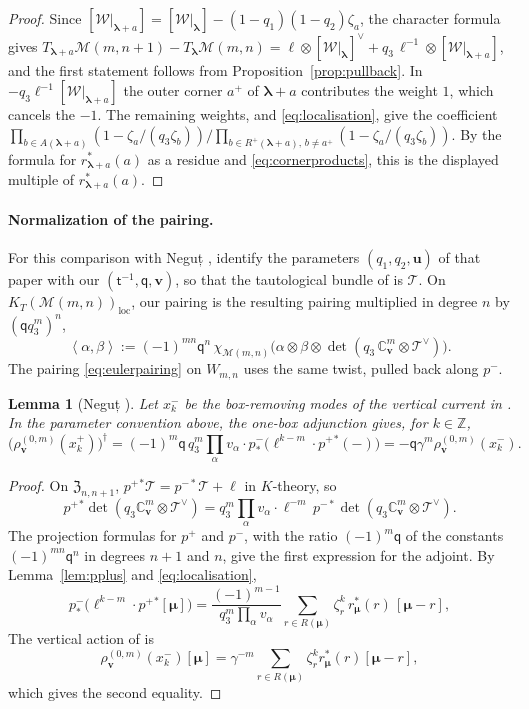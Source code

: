 \documentclass[11pt]{amsart}
\newtheorem{lemma}[theorem]{Lemma}
\theoremstyle{definition}
\theoremstyle{remark}
\newcommand{\Mq}{\mathsf q}                      %
\newcommand{\Mt}{\mathsf t}                      %
\newcommand{\bv}{{\mathbf v}}                    %
\newcommand{\bl}{{\boldsymbol{\lambda}}}         %
\newcommand{\bmu}{{\boldsymbol{\mu}}}
\newcommand{\Add}[1]{A(#1)}                      %
\newcommand{\Rem}[1]{R(#1)}                      %
\newcommand{\bwt}[1]{\zeta_{#1}}                 %
\newcommand{\cores}[2]{r^*_{#1}(#2)}             %
\newcommand{\ip}[2]{\left\langle #1,#2\right\rangle}
\newcommand{\bplus}[1]{{#1}^{+}}                 %
\newcommand{\Remp}[1]{R^{+}(#1)}                 %
\newcommand{\Wdeg}[2]{W_{#1,#2}}                 %
\newcommand{\Kloc}[1]{K_T(#1)_{\mathrm{loc}}}    %
\newcommand{\framing}{\mathbb C^m_{\bv}}         %
\newcommand{\Gies}[2]{\mathcal M(#1,#2)}         %
\newcommand{\Zc}{\mathfrak Z}
\newcommand{\Hecke}[1]{\Zc_{#1,#1+1}}            %
\newcommand{\Wc}{\mathcal W}                     %
\newcommand{\Tc}{\mathcal T}                     %
\newcommand{\fix}[1]{[#1]}                       %
\newcommand{\pminus}{p^-}                        %
\newcommand{\pplus}{p^+}                         %
\newcommand{\taut}{\ell}                         %
\newcommand{\pulm}{p^{-*}}                       %
\newcommand{\xplus}[1]{x^+_{#1}}                 %
\newcommand{\rhov}{\rho^{(0,m)}_{\bv}}           %
\newcommand{\Negut}{Neguț}
\begin{document}
\begin{proof}
Since \([\Wc|_{\bl+a}]=[\Wc|_\bl]-(1-q_1)(1-q_2)\bwt{a}\), the character formula
gives
\(T_{\bl+a}\Gies{m}{n+1}-T_\bl\Gies{m}{n}
=\taut\otimes[\Wc|_\bl]^\vee+q_3\,\taut^{-1}\otimes[\Wc|_{\bl+a}]\), and the
first statement follows from Proposition~\ref{prop:pullback}. In
\(-q_3\taut^{-1}[\Wc|_{\bl+a}]\) the outer corner \(\bplus{a}\) of \(\bl+a\)
contributes the weight \(1\), which cancels the \(-1\). The remaining weights,
and \eqref{eq:localisation}, give the coefficient
\(\prod_{b\in\Add{\bl+a}}(1-\bwt{a}/(q_3\bwt{b}))
/\prod_{b\in\Remp{\bl+a},\,b\neq\bplus{a}}(1-\bwt{a}/(q_3\bwt{b}))\). By the
formula for \(\cores{\bl+a}{a}\) as a residue and \eqref{eq:cornerproducts},
this is the displayed multiple of \(\cores{\bl+a}{a}\).
\end{proof}

\paragraph{Normalization of the pairing.}
For this comparison with \Negut{} \cite[(3.35)]{N3}, identify the parameters
\((q_1,q_2,\mathbf u)\) of that paper with our
\((\Mt^{-1},\Mq,\bv)\), so that the tautological bundle of \cite{N3} is \(\Tc\).
On \(\Kloc{\Gies{m}{n}}\), our pairing is the resulting pairing multiplied
in degree \(n\) by \((\Mq q_3^m)^n\),
\[
 \ip{\alpha}{\beta}:=(-1)^{mn}\Mq^{n}\,\chi_{\Gies{m}{n}}\bigl(\alpha\otimes\beta\otimes
 \det(q_3\,\framing\otimes\Tc^\vee)\bigr).
\]
The pairing \eqref{eq:eulerpairing} on \(\Wdeg{m}{n}\) uses the same twist,
pulled back along \(\pminus\).

\begin{lemma}[{\Negut{} \cite{N3}}]\label{lem:negut}
Let \(x^-_k\) be the box-removing modes of the vertical current in \cite{BCS}.
In the parameter convention above, the one-box adjunction
\cite[(3.39)]{N3} gives, for \(k\in\mathbb Z\),
\[
 \bigl(\rhov(\xplus{k})\bigr)^\dagger=
 (-1)^m\Mq\,q_3^m\prod_\alpha v_\alpha\cdot\pminus_*\bigl(\taut^{k-m}\cdot\pplus{}^*(-)\bigr)
 =-\Mq\gamma^m\rhov(x^-_k).
\]
\end{lemma}

\begin{proof}
On \(\Hecke{n}\), \(\pplus{}^*\Tc=\pulm\Tc+\taut\) in \(K\)-theory, so
\[
 \pplus{}^*\det(q_3\framing\otimes\Tc^\vee)
 =q_3^m\prod_\alpha v_\alpha\cdot\taut^{-m}\,\pulm\det(q_3\framing\otimes\Tc^\vee).
\]
The projection formulas for \(\pplus\) and \(\pminus\), with the ratio \((-1)^m\Mq\) of the constants
\((-1)^{mn}\Mq^n\) in degrees \(n+1\) and \(n\), give the first expression for the adjoint. By
Lemma~\ref{lem:pplus} and \eqref{eq:localisation},
\[
 \pminus_*\bigl(\taut^{k-m}\cdot\pplus{}^*\fix{\bmu}\bigr)
 =\frac{(-1)^{m-1}}{q_3^m\prod_\alpha v_\alpha}\sum_{r\in\Rem{\bmu}}\bwt{r}^k\,\cores{\bmu}{r}\,\fix{\bmu-r},
\]
The vertical action of \cite[Section~2.2.1]{BCS} is
\[
 \rhov(x^-_k)\fix{\bmu}
 =\gamma^{-m}\sum_{r\in\Rem{\bmu}}\bwt{r}^k\cores{\bmu}{r}\fix{\bmu-r},
\]
which gives the second equality.
\end{proof}
\end{document}
